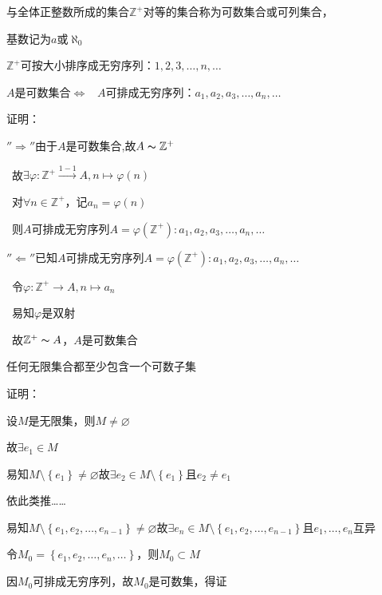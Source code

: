 \begin{td}
与全体正整数所成的集合$\mathbb{Z}^{+}$对等的集合称为可数集合或可列集合，
\par \quad  基数记为$a$或$\aleph _{0}$    
\end{td}

\begin{wa}
$\mathbb{Z}^{+}$可按大小排序成无穷序列：$1,2,3,\dots,n,\dots$\par
\pmb{\textcolor{red}{$\bigstar$}}$A$是可数集合$\Leftrightarrow $ \ $A$可排成无穷序列：$a_{1},a_{2},a_{3},\dots,a_{n},\dots$    
\end{wa}
\noindent 证明：
\par $''\Rightarrow''$由于$A$是可数集合,故$A\thicksim \mathbb{Z}^{+}$
\par \quad \quad \ 故$\exists \varphi : \mathbb{Z}^{+} \stackrel{1-1}{\to} A ,n \mapsto \varphi (n)$
\par \quad \quad \ 对$\forall n \in \mathbb{Z}^{+}$，记$a_{n} = \varphi (n)$
\par \quad \quad \ 则$A$可排成无穷序列$A = \varphi (\mathbb{Z}^{+}) : a_{1},a_{2},a_{3},\dots,a_{n},\dots$
\par $''\Leftarrow ''$已知$A$可排成无穷序列$A = \varphi (\mathbb{Z}^{+}) : a_{1},a_{2},a_{3},\dots,a_{n},\dots$
\par \quad \quad \ 令$\varphi : \mathbb{Z}^{+} \to A ,n \mapsto a_{n}$
\par \quad \quad \ 易知$\varphi $是双射
\par \quad \quad \ 故$\mathbb{Z}^{+}\thicksim A$，$A$是可数集合

\begin{td}
任何无限集合都至少包含一个可数子集    
\end{td}
\noindent 证明：
\par 设$M$是无限集，则$M \neq \varnothing $
\par 故$\exists e_{1} \in M$
\par 易知$M \setminus \left\{e_{1}\right\} \neq \varnothing$故$\exists e_{2} \in M\setminus \left\{e_{1}\right\} $且$e_{2} \neq e_{1}$
\par 依此类推\dots \dots
\par 易知$M \setminus \left\{e_{1},e_{2},\dots,e_{n-1}\right\} \neq \varnothing$故$\exists e_{n} \in M\setminus \left\{e_{1},e_{2},\dots,e_{n-1}\right\} $且$e_{1},\dots,e_{n}$互异
\par 令$M_{0} = \left\{e_{1},e_{2},\dots,e_{n},\dots\right\} $，则$M_{0} \subset M$
\par 因$M_{0}$可排成无穷序列，故$M_{0}$是可数集，得证

